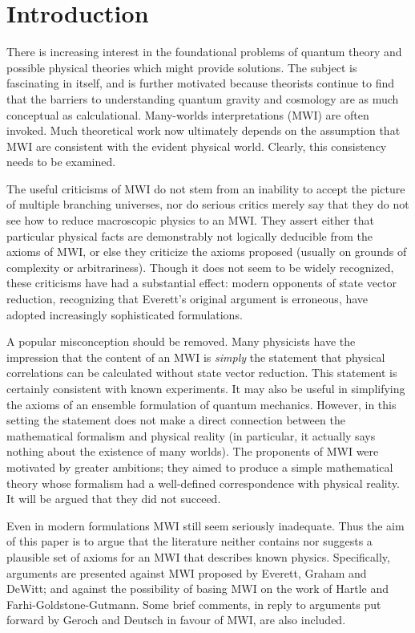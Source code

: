 \documentclass[aps,pra,12pt]{revtex4}
\begin{document}
\eject
\section{Introduction}

There is increasing interest in the foundational problems of quantum theory and
possible physical theories which might provide solutions.  
The subject is fascinating in itself, and is further motivated because
theorists continue to find that the barriers to understanding 
quantum gravity and cosmology are as much conceptual as calculational.  
Many-worlds interpretations (MWI) are often invoked.  Much theoretical work now
ultimately depends on the assumption that MWI are consistent with the
evident physical world.  Clearly, this consistency needs to be
examined.

The useful criticisms of MWI do not stem from an inability to accept
the picture of multiple branching universes, nor do serious critics
merely say that they do not see how to reduce macroscopic physics to
an MWI.  They assert either that particular physical facts are
demonstrably not logically deducible from the axioms of MWI, or else
they criticize the axioms proposed (usually on grounds of complexity
or arbitrariness).  Though it does not seem to be widely recognized,
these criticisms have had a substantial effect: modern opponents of
state vector reduction, recognizing that Everett's original argument
is erroneous, have adopted increasingly sophisticated formulations.

A popular misconception should be removed.  Many physicists have the
impression that the content of an MWI is {\em simply} the statement
that physical correlations can be calculated without state vector
reduction.  This statement is certainly consistent with known
experiments.  It may also be useful in simplifying the axioms of an
ensemble formulation of quantum mechanics.  
However, in this setting the statement does not
make a direct connection between the mathematical formalism and
physical reality (in particular, it actually says nothing about the
existence of many worlds).  The proponents of MWI were
motivated by greater ambitions; they aimed to produce a simple
mathematical theory whose formalism had a well-defined correspondence
with physical reality.  It will be argued that they did not succeed.

Even in modern formulations MWI still seem
seriously inadequate.
Thus the aim of this paper is to argue that the literature neither contains 
nor suggests a plausible set of axioms for an MWI that describes
known physics. 
Specifically, arguments are presented against
MWI proposed by Everett,\cite{ev} Graham\cite{gr} and
DeWitt;\cite{dew} and against the possibility of basing MWI on the
work of Hartle\cite{har} and Farhi-Goldstone-Gutmann.\cite{fgg} Some
brief comments, in reply to arguments put forward by Geroch\cite{ger}
and Deutsch\cite{deutsch} in favour of MWI, are also included.
\end{document}
